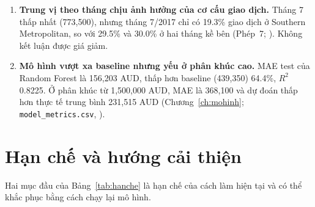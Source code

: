 \begin{enumerate}
  \item \textbf{Trung vị theo tháng chịu ảnh hưởng của cơ cấu giao dịch.} Tháng 7 thấp nhất (773,500), nhưng tháng 7/2017 chỉ có 19.3\% giao dịch ở Southern Metropolitan, so với 29.5\% và 30.0\% ở hai tháng kề bên (Phép~7; ). Không kết luận được giá giảm.
  \item \textbf{Mô hình vượt xa baseline nhưng yếu ở phân khúc cao.} MAE test của Random Forest là 156,203 AUD, thấp hơn baseline (439,350) 64.4\%, $R^2$ 0.8225. Ở phân khúc từ 1,500,000 AUD, MAE là 368,100 và dự đoán thấp hơn thực tế trung bình 231,515 AUD (Chương~\ref{ch:mohinh}; \texttt{model\_metrics.csv}, ).
\end{enumerate}

\section{Hạn chế và hướng cải thiện}\label{sec:hanche}
Hai mục đầu của Bảng~\ref{tab:hanche} là hạn chế của cách làm hiện tại và có thể khắc phục bằng cách chạy lại mô hình.

